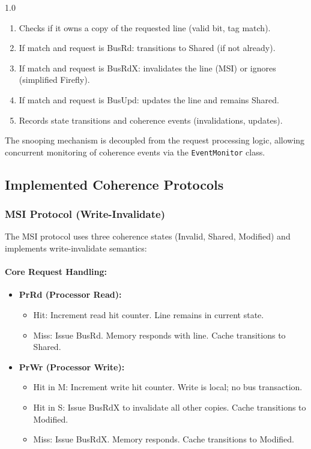 \documentclass[12pt]{article}
\begin{document}
\begin{spacing}{1.0}
\begin{enumerate}
    \item Checks if it owns a copy of the requested line (valid bit, tag match).
    \item If match and request is BusRd: transitions to Shared (if not already).
    \item If match and request is BusRdX: invalidates the line (MSI) or ignores (simplified Firefly).
    \item If match and request is BusUpd: updates the line and remains Shared.
    \item Records state transitions and coherence events (invalidations, updates).
\end{enumerate}

The snooping mechanism is decoupled from the request processing logic, allowing concurrent monitoring of coherence events via the \texttt{EventMonitor} class.

\subsection{Implemented Coherence Protocols}

\subsubsection{MSI Protocol (Write-Invalidate)}

The MSI protocol uses three coherence states (Invalid, Shared, Modified) and implements write-invalidate semantics:

\paragraph{Core Request Handling:}

\begin{itemize}
    \item \textbf{PrRd (Processor Read):}
    \begin{itemize}
        \item Hit: Increment read hit counter. Line remains in current state.
        \item Miss: Issue BusRd. Memory responds with line. Cache transitions to Shared.
    \end{itemize}
    
    \item \textbf{PrWr (Processor Write):}
    \begin{itemize}
        \item Hit in M: Increment write hit counter. Write is local; no bus transaction.
        \item Hit in S: Issue BusRdX to invalidate all other copies. Cache transitions to Modified.
        \item Miss: Issue BusRdX. Memory responds. Cache transitions to Modified.
    \end{itemize}
\end{itemize}


\end{spacing}
\end{document}
